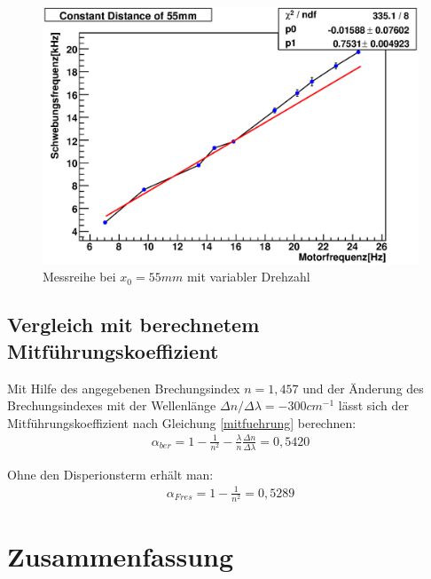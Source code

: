 \documentclass[12pt]{article}
\begin{document}
\begin{figure}[H]  
\centering
\includegraphics[width=0.7\linewidth]{pictures/55mm1.eps}
\caption{Messreihe bei $x_0 = 55mm$ mit variabler Drehzahl}
\label{55mm}
\end{figure}

\subsection{Vergleich mit berechnetem Mitführungskoeffizient}
Mit Hilfe des angegebenen Brechungsindex $n=1,457$ und der Änderung des Brechungsindexes mit der Wellenlänge $\Delta n / \Delta\lambda = -300 cm^{-1}$
lässt sich der Mitführungskoeffizient nach Gleichung \ref{mitfuehrung} berechnen:
\begin{align}
 \alpha_{ber} = 1 - \frac{1}{n^2} - \frac{\lambda}{n} \frac{\Delta n}{\Delta \lambda} = 0,5420
\end{align}

Ohne den Disperionsterm erhält man:
\begin{align}
 \alpha_{Fres} = 1 - \frac{1}{n^2} = 0,5289
\end{align}

\section{Zusammenfassung}
\end{document}
